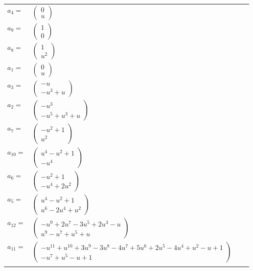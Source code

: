 \documentclass[1p]{elsarticle_modified}
\theoremstyle{definition}
\begin{document}
\begin{tabular}{m{7pt} m{180pt} m{7pt} m{180pt} }
\flushright $a_{4}=$&$\begin{pmatrix}0\\u\end{pmatrix}$ \\
\flushright $a_{9}=$&$\begin{pmatrix}1\\0\end{pmatrix}$ \\
\flushright $a_{8}=$&$\begin{pmatrix}1\\u^2\end{pmatrix}$ \\
\flushright $a_{1}=$&$\begin{pmatrix}0\\u\end{pmatrix}$ \\
\flushright $a_{3}=$&$\begin{pmatrix}- u\\- u^3+u\end{pmatrix}$ \\
\flushright $a_{2}=$&$\begin{pmatrix}- u^3\\- u^5+u^3+u\end{pmatrix}$ \\
\flushright $a_{7}=$&$\begin{pmatrix}- u^2+1\\u^2\end{pmatrix}$ \\
\flushright $a_{10}=$&$\begin{pmatrix}u^4- u^2+1\\- u^4\end{pmatrix}$ \\
\flushright $a_{6}=$&$\begin{pmatrix}- u^2+1\\- u^4+2 u^2\end{pmatrix}$ \\
\flushright $a_{5}=$&$\begin{pmatrix}u^4- u^2+1\\u^6-2 u^4+u^2\end{pmatrix}$ \\
\flushright $a_{12}=$&$\begin{pmatrix}- u^9+2 u^7-3 u^5+2 u^3- u\\u^9- u^7+u^5+u\end{pmatrix}$ \\
\flushright $a_{11}=$&$\begin{pmatrix}- u^{11}+u^{10}+3 u^9-3 u^8-4 u^7+5 u^6+2 u^5-4 u^4+u^2- u+1\\- u^7+u^5- u+1\end{pmatrix}$\\&\end{tabular}
\end{document}
